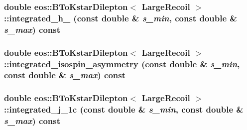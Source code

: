 \hypertarget{classeos_1_1BToKstarDilepton_3_01LargeRecoil_01_4_a3b8088372d3a79556a70c874d7bff834}{
\subsubsection[{integrated\_\-h\_\-5}]{\setlength{\rightskip}{0pt plus 5cm}double eos::BToKstarDilepton$<$ {\bf LargeRecoil} $>$::integrated\_\-h\_ (const double \& {\em s\_\-min}, \/  const double \& {\em s\_\-max}) const}}
\label{classeos_1_1BToKstarDilepton_3_01LargeRecoil_01_4_a3b8088372d3a79556a70c874d7bff834}
\hypertarget{classeos_1_1BToKstarDilepton_3_01LargeRecoil_01_4_ad5e19e4be9af758ada5e3caf7f722df4}{
\subsubsection[{integrated\_\-isospin\_\-asymmetry}]{\setlength{\rightskip}{0pt plus 5cm}double eos::BToKstarDilepton$<$ {\bf LargeRecoil} $>$::integrated\_\-isospin\_\-asymmetry (const double \& {\em s\_\-min}, \/  const double \& {\em s\_\-max}) const}}
\label{classeos_1_1BToKstarDilepton_3_01LargeRecoil_01_4_ad5e19e4be9af758ada5e3caf7f722df4}
\hypertarget{classeos_1_1BToKstarDilepton_3_01LargeRecoil_01_4_acecdd3061211d3b737cb7ddd3cfb0a27}{
\subsubsection[{integrated\_\-j\_\-1c}]{\setlength{\rightskip}{0pt plus 5cm}double eos::BToKstarDilepton$<$ {\bf LargeRecoil} $>$::integrated\_\-j\_\-1c (const double \& {\em s\_\-min}, \/  const double \& {\em s\_\-max}) const}}
\label{classeos_1_1BToKstarDilepton_3_01LargeRecoil_01_4_acecdd3061211d3b737cb7ddd3cfb0a27}
